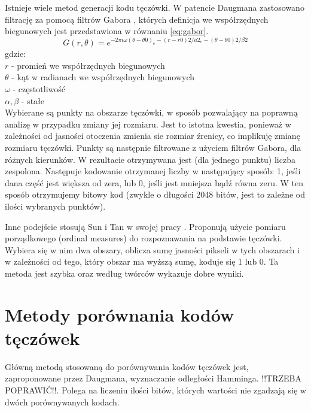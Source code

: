 Istnieje wiele metod generacji kodu tęczówki. W patencie Daugmana zastosowano filtrację za pomocą filtrów Gabora \cite{Daugman}, których definicja we współrzędnych biegunowych jest przedstawiona w równaniu \ref{eq:gabor}.
\begin{equation}
\label{eq:gabor}
G(r,\theta) = e^{-2\pi i\omega (\theta - \theta 0)_{e}-(r - r0)2/a2_{e}-(\theta-\theta 0 )2/\beta 2}
\end{equation}
gdzie:\\
$r$ - promień we współrzędnych biegunowych \\
$\theta$ - kąt w radianach we współrzędnych biegunowych \\
$ \omega $ - częstotliwość \\
$ \alpha, \beta $ - stałe \\
Wybierane są punkty na obszarze tęczówki, w sposób pozwalający na poprawną analizę w przypadku zmiany jej rozmiaru. Jest to istotna kwestia, ponieważ w zależności od jasności otoczenia zmienia sie rozmiar źrenicy, co implikuję zmianę rozmiaru tęczówki. Punkty są następnie filtrowane z użyciem filtrów Gabora, dla różnych kierunków. W rezultacie otrzymywana jest (dla jednego punktu) liczba zespolona. Następuje kodowanie otrzymanej liczby w następujący sposób: 1, jeśli dana część jest większa od zera, lub 0, jeśli jest mniejsza bądź równa zeru. W ten sposób otrzymujemy bitowy kod (zwykle o długości 2048 bitów, jest to zależne od ilości wybranych punktów).

Inne podejście stosują Sun i Tan w swojej pracy \cite{TaSu09}. Proponują użycie pomiaru porządkowego (ordinal measures) do rozpoznawania na podstawie tęczówki. Wybiera się w nim dwa obszary, oblicza sumę jasności pikseli w tych obszarach i w zależności od tego, który obszar ma wyższą sumę, koduje się 1 lub 0. Ta metoda jest szybka oraz według twórców wykazuje dobre wyniki.

\section{Metody porównania kodów tęczówek}
\label{sec:metodyPorownaniaKodow}
Główną metodą stosowaną do porównywania kodów tęczówek jest, zaproponowane przez Daugmana, wyznaczanie odległości Hamminga. !!TRZEBA POPRAWIĆ!!. Polega na liczeniu ilości bitów, których wartości nie zgadzają się w dwóch porównywanych kodach.
